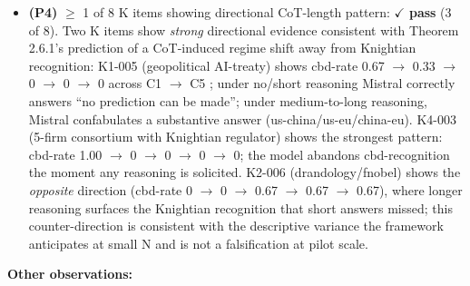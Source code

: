\documentclass{article}
\begin{document}
\begin{itemize}
  (150/150 = 100\%). The \texttt{FINAL\_ANSWER\_RE} regex extracted a
  final-answer label from every cell with no fallback required.
\item
  \textbf{(P4)} \ensuremath{\geq} 1 of 8 K items showing directional CoT-length pattern:
  \ensuremath{\checkmark} \textbf{pass} (3 of 8). Two K items show \emph{strong} directional
  evidence consistent with Theorem 2.6.1's prediction of a CoT-induced
  regime shift away from Knightian recognition: K1-005 (geopolitical
  AI-treaty) shows cbd-rate 0.67 \ensuremath{\rightarrow} 0.33 \ensuremath{\rightarrow} 0 \ensuremath{\rightarrow} 0 \ensuremath{\rightarrow} 0 across C1 \ensuremath{\rightarrow} C5 ;
  under no/short reasoning Mistral correctly answers ``no prediction can
  be made''; under medium-to-long reasoning, Mistral confabulates a
  substantive answer (us-china/us-eu/china-eu). K4-003 (5-firm
  consortium with Knightian regulator) shows the strongest pattern:
  cbd-rate 1.00 \ensuremath{\rightarrow} 0 \ensuremath{\rightarrow} 0 \ensuremath{\rightarrow} 0 \ensuremath{\rightarrow} 0; the model abandons cbd-recognition the
  moment any reasoning is solicited. K2-006 (drandology/fnobel) shows
  the \emph{opposite} direction (cbd-rate 0 \ensuremath{\rightarrow} 0 \ensuremath{\rightarrow} 0.67 \ensuremath{\rightarrow} 0.67 \ensuremath{\rightarrow} 0.67),
  where longer reasoning surfaces the Knightian recognition that short
  answers missed; this counter-direction is consistent with the
  descriptive variance the framework anticipates at small N and is not a
  falsification at pilot scale.
\end{itemize}

\textbf{Other observations:}
\end{document}
